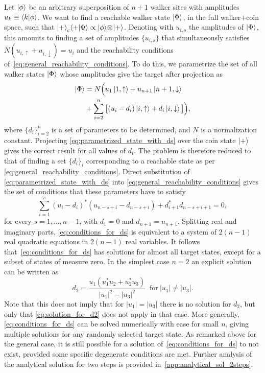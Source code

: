 Let $\ket\phi$ be an arbitrary superposition of $n+1$ walker sites with amplitudes $u_k \equiv \braket{k}{\phi}$.
We want to find a reachable walker state $\ket\Phi$, in the full walker+coin space, such that
$\ket{+}_c \!\braket{+}{\Phi} \propto \ket\phi \!\otimes\! \ket+$.
Denoting with $u_{i,s}$ the amplitudes of $\ket\Phi$, this amounts to finding a set of amplitudes $\{u_{i,s}\}$ that simultaneously satisfies
${N(u_{i,\uparrow}+u_{i,\downarrow})= u_i}$
and the reachability conditions of~\cref{eq:general_reachability_conditions}.
To do this, we parametrize the set of all walker states $\ket\Phi$ whose amplitudes give the target after projection as
\begin{equation}
\begin{aligned}
	\ket\Phi &= N \Big( u_1 \ket{1,\uparrow} + u_{n+1} \ket{n+1,\downarrow} \\
	&+ \sum_{i=2}^n \big[
		(u_i - d_i) \ket{i, \uparrow} +
		d_i \ket{i, \downarrow}
	\big] \Big),
\end{aligned}
\label{eq:parametrized_state_with_ds}
\end{equation}
where $\{ d_i \}_{i=2}^n$ is a set of parameters to be determined, and $N$ is a normalization constant.
Projecting \cref{eq:parametrized_state_with_ds} over the coin state $\ket+$ gives the correct result for all values of $d_i$.
The problem is therefore reduced to that of finding a set $\{d_i\}_i$ corresponding to a reachable state as per \cref{eq:general_reachability_conditions}.
Direct substitution of \cref{eq:parametrized_state_with_ds} into \cref{eq:general_reachability_conditions} gives the set of conditions that these parameters have to satisfy
\begin{equation}
	\sum_{i=1}^s
	(u_i - d_i)^*
	(u_{n-s+i} - d_{n-s+i})
	+
	d_{i+1}^* d_{n-s+i+1}
	= 0,
	\label{eq:conditions_for_ds}
\end{equation}
for every $s=1,...,n-1$,
with $d_1=0$ and $d_{n+1}=u_{n+1}$.
Splitting real and imaginary parts, \cref{eq:conditions_for_ds} is equivalent to a system of $2(n-1)$ real quadratic equations in $2(n-1)$ real variables.
It follows that~\cref{eq:conditions_for_ds} has solutions for almost all target states, except for a subset of states of measure zero.
In the simplest case $n=2$ an explicit solution can be written as
\begin{equation}
	d_2 = \frac{
		u_1(u_1^* u_2 + u_2^* u_3)
	}{
		\lvert u_1 \rvert^2 - \lvert u_3 \rvert^2
	}~\text{ for}~\lvert u_1 \rvert \neq \lvert u_3 \rvert.
	\label{eq:solution_for_d2}
\end{equation}
Note that this does not imply that for $\lvert u_1 \rvert = \lvert u_3 \rvert$ there is no solution for $d_2$, but only that \cref{eq:solution_for_d2} does not apply in that case.
More generally, \cref{eq:conditions_for_ds}
can be solved numerically with ease for small $n$, giving multiple solutions for any randomly selected target state.
As remarked above for the general case, it is still possible for a solution of~\cref{eq:conditions_for_ds} to not exist, provided some specific degenerate conditions are met.
Further analysis of the analytical solution for two steps is provided in~\cref{app:analytical_sol_2steps}.

